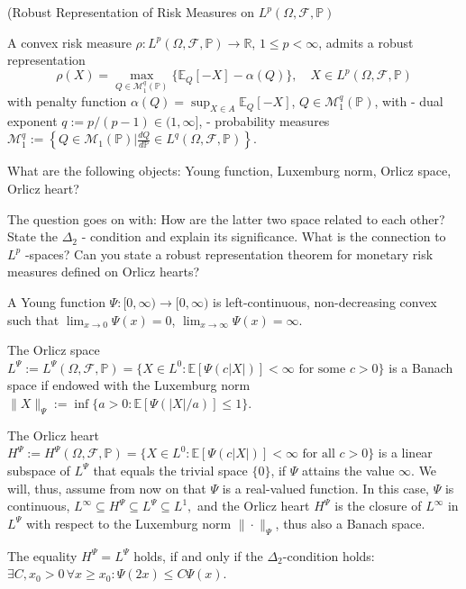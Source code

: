 (Robust Representation of Risk Measures on \( L^p(\Omega, \mathcal{F}, \mathbb{P}) \)

A convex risk measure \(\rho : L^p(\Omega, \mathcal{F}, \mathbb{P}) \to \mathbb{R}\), \(1 \leq p < \infty\), admits a robust representation 
\[
\rho(X) = \max_{Q \in \mathcal{M}_1^q(\mathbb{P})} \{\mathbb{E}_Q[-X] - \alpha(Q)\}, \quad X \in L^p(\Omega, \mathcal{F}, \mathbb{P})
\]
with penalty function \(\alpha(Q) = \sup_{X \in A} \mathbb{E}_Q[-X]\), \(Q \in \mathcal{M}_1^q(\mathbb{P})\), with
- dual exponent \(q := p/(p-1) \in (1, \infty]\),
- probability measures \(\mathcal{M}_1^q := \left\{ Q \in \mathcal{M}_1(\mathbb{P}) \bigg| \frac{dQ}{d\mathbb{P}} \in L^q(\Omega, \mathcal{F}, \mathbb{P}) \right\}\).

What are the following objects: Young function, Luxemburg norm, Orlicz space, Orlicz heart?

The question goes on with:
How are the latter two space related to each other? State the \( \Delta_2 \) -
condition and explain its significance. What is the connection to \( L^p \) -spaces? Can
you state a robust representation theorem for monetary risk measures defined on
Orlicz hearts?

A Young function \(\Psi: [0, \infty) \to [0, \infty)\)
is left-continuous, non-decreasing convex such that \(\lim_{x \to 0} \Psi(x) = 0\), \(\lim_{x \to \infty} \Psi(x) = \infty\).

The Orlicz space
\(
L^\Psi := L^\Psi(\Omega, \mathcal{F}, \mathbb{P}) = \{X \in L^0 : \mathbb{E}[\Psi(c|X|)] < \infty \text{ for some } c > 0 \}
\)
is a Banach space if endowed with the Luxemburg norm
\(
\|X\|_\Psi := \inf\{a > 0 : \mathbb{E}[\Psi(|X|/a)] \leq 1\}.
\)

The Orlicz heart
\(H^\Psi := H^\Psi(\Omega, \mathcal{F}, \mathbb{P}) = \{X \in L^0 : \mathbb{E}[\Psi(c|X|)] < \infty \text{ for all } c > 0\}\)
is a linear subspace of \(L^\Psi\) that equals the trivial space \(\{0\}\), if \(\Psi\) attains the value \(\infty\). 
We will, thus, assume from now on that \(\Psi\) is a real-valued function. In this case, \(\Psi\) is continuous,
\(
L^\infty \subseteq H^\Psi \subseteq L^\Psi \subseteq L^1,
\)
and the Orlicz heart \(H^\Psi\) is the closure of \(L^\infty\) in \(L^\Psi\) with respect to the Luxemburg norm \(\|\cdot \|_\Psi\), thus also a Banach space.

The equality \(H^\Psi = L^\Psi\) holds, if and only if the \(\Delta_2\)-condition holds:
\(
\exists C, x_0 > 0 \, \forall x \geq x_0 : \Psi(2x) \leq C \Psi(x).
\)


